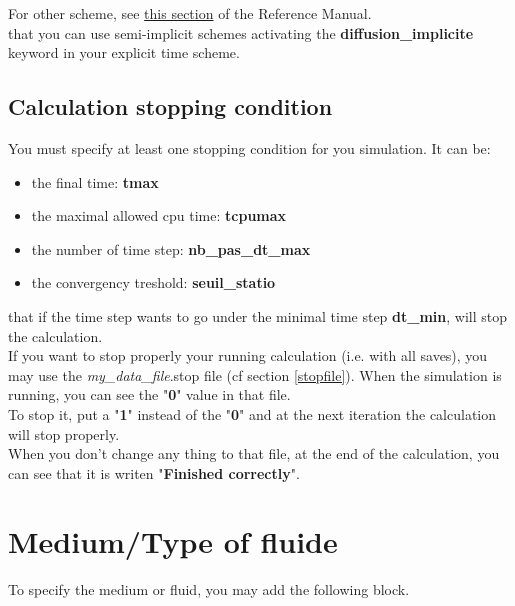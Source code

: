 For other scheme, see \href{../../Outils/TRIOXDATA/XTriou/doc.pdf\#schematempsbase}{this section} of the Reference Manual.\\

\Note that you can use semi-implicit schemes activating the \textbf{diffusion\_implicite} keyword in your explicit time scheme.



\subsection{Calculation stopping condition}
You must specify at least one stopping condition for you simulation.
It can be:
\begin{itemize}
\item the final time: \textbf{tmax}
\item the maximal allowed cpu time: \textbf{tcpumax}
\item the number of time step: \textbf{nb\_pas\_dt\_max}
\item the convergency treshold: \textbf{seuil\_statio}
\end{itemize}

\Note that if the time step wants to go under the minimal time step \textbf{dt\_min}, \trust will stop the calculation.\\

If you want to stop properly your running calculation (i.e. with all saves), you may use the \textit{my\_data\_file}.stop file (cf section \ref{stopfile}).
When the simulation is running, you can see the "\textbf{0}" value in that file.\\

To stop it, put a "\textbf{1}" instead of the "\textbf{0}" and at the next iteration the calculation will stop properly.\\

When you don't change any thing to that file, at the end of the calculation, you can see that it is writen "\textbf{Finished correctly}".


\section{Medium/Type of fluide}
To specify the medium or fluid, you may add the following block.

